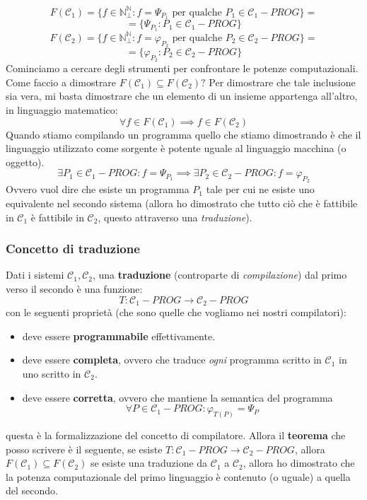 \documentclass{article}
\begin{document}
$$F(\mathcal{C}_1)=\{f\in\mathbb{N}_\bot^\mathbb{N}: f=\Psi_{P_1}\text{ per qualche }P_1\in\mathcal{C}_1-PROG\}=$$
$$=\{\Psi_{P_1}:P_1\in\mathcal{C}_1-PROG\}$$
$$F(\mathcal{C}_2)=\{f\in\mathbb{N}_\bot^\mathbb{N}: f=\varphi_{P_2}\text{ per qualche }P_2\in\mathcal{C}_2-PROG\}=$$
$$=\{\varphi_{P_2}:P_2\in\mathcal{C}_2-PROG\}$$
Cominciamo a cercare degli strumenti per confrontare le potenze computazionali. Come faccio a dimostrare
$F(\mathcal{C}_1)\subseteq F(\mathcal{C}_2)?$
Per dimostrare che tale inclusione sia vera, mi basta dimostrare che un elemento di un insieme appartenga
all'altro, in linguaggio matematico:
$$\forall f\in F(\mathcal{C}_1)\implies f\in F(\mathcal{C}_2)$$
Quando stiamo compilando un programma quello che stiamo dimostrando è che il linguaggio utilizzato
come sorgente è potente uguale al linguaggio macchina (o oggetto).
$$\exists P_1\in\mathcal{C}_1-PROG : f=\Psi_{P_1}\implies\exists P_2\in\mathcal{C}_2-PROG:f=\varphi_{P_2}$$
Ovvero vuol dire che esiste un programma $P_1$ tale per cui ne esiste uno equivalente nel secondo
sistema (allora ho dimostrato che tutto ciò che è fattibile in $\mathcal{C}_1$ è fattibile in $\mathcal{C}_2$,
questo attraverso una \textit{traduzione}).

\subsubsection{Concetto di traduzione}
Dati i sistemi $\mathcal{C}_1,\mathcal{C}_2$, una \textbf{traduzione} (controparte di \textit{compilazione}) dal primo verso il secondo è
una funzione:
$$T:\mathcal{C}_1-PROG\rightarrow\mathcal{C}_2-PROG$$
con le seguenti proprietà (che sono quelle che vogliamo nei nostri compilatori):
\begin{itemize}
    \item deve essere \textbf{programmabile} effettivamente.
    \item deve essere \textbf{completa}, ovvero che traduce \textit{ogni} programma scritto in $\mathcal{C}_1$ in
          uno scritto in $\mathcal{C}_2$.
    \item deve essere \textbf{corretta}, ovvero che mantiene la semantica del programma
          $$\forall P\in\mathcal{C}_1-PROG:\varphi_{T(P)}=\Psi_P$$
\end{itemize}
questa è la formalizzazione del concetto di compilatore. Allora il \textbf{teorema} che posso scrivere
è il seguente, se esiste $T:\mathcal{C}_1-PROG\rightarrow\mathcal{C}_2-PROG$, allora $F(\mathcal{C}_1)\subseteq F(\mathcal{C}_2)$
se esiste una traduzione da $\mathcal{C}_1$ a $\mathcal{C}_2$, allora ho dimostrato che la potenza computazionale del
primo linguaggio è contenuto (o uguale) a quella del secondo.
\end{document}
